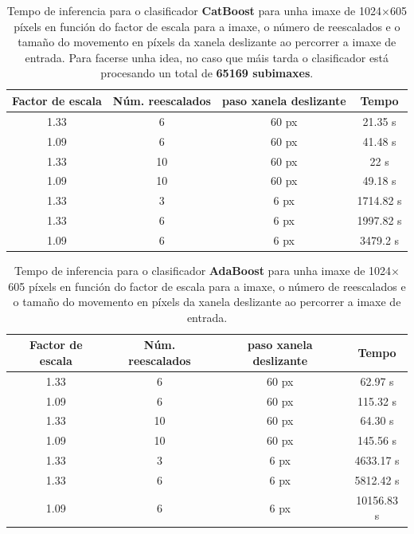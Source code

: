 \documentclass[galician]{./head/uvigo-tfg}
\begin{document}
        \begin{table}[t]
    \centering
        \begin{tabular}{c | c | c | c}
        Factor de escala & Núm. reescalados & paso xanela deslizante & Tempo \\ \hline
        1.33 & 6 & 60 px & 21.35 s \\ 
        1.09 & 6 & 60 px & 41.48 s \\ 
        1.33 & 10 & 60 px & 22 s \\ 
        1.09 & 10 & 60 px & 49.18 s \\
        1.33 & 3 & 6 px & 1714.82 s \\ 
        1.33 & 6 & 6 px & 1997.82 s \\ 
        1.09 & 6 & 6 px & 3479.2 s \\
        \end{tabular}
        \caption {Tempo de inferencia para o clasificador \textbf{CatBoost} para unha imaxe de 1024$\times$605 píxels en función do factor de escala para a imaxe, o número de reescalados e o tamaño do movemento en píxels da xanela deslizante ao percorrer a imaxe de entrada. Para facerse unha idea, no caso que máis tarda o clasificador está procesando un total de \textbf{65169 subimaxes}.}
        \label{tab:CatBoostTime} 
    \end{table}
    \begin{table}[t]
    \centering
        \begin{tabular}{c | c | c | c}
        Factor de escala & Núm. reescalados & paso xanela deslizante & Tempo \\ \hline
        1.33 & 6 & 60 px & 62.97 s \\ 
        1.09 & 6 & 60 px & 115.32 s \\ 
        1.33 & 10 & 60 px & 64.30 s \\ 
        1.09 & 10 & 60 px & 145.56 s \\
        1.33 & 3 & 6 px & 4633.17 s \\ 
        1.33 & 6 & 6 px & 5812.42 s \\ 
        1.09 & 6 & 6 px & 10156.83 s \\
        \end{tabular}
        \caption {Tempo de inferencia para o clasificador \textbf{AdaBoost} para unha imaxe de 1024$\times$605 píxels en función do factor de escala para a imaxe, o número de reescalados e o tamaño do movemento en píxels da xanela deslizante ao percorrer a imaxe de entrada.}
        \label{tab:AdaBoostTime} 
    \end{table}
\end{document}
